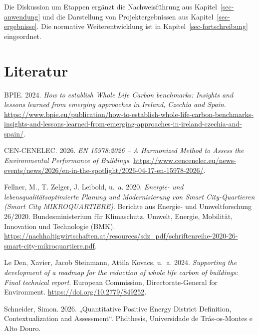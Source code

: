 \documentclass[
  ngerman,
  a4paper,
  DIV=11]{scrreprt}
\newlength{\cslhangindent}
\newenvironment{CSLReferences}[2] %
 {\begin{list}{}{%
  \setlength{\itemindent}{0pt}
  \setlength{\leftmargin}{0pt}
  \setlength{\parsep}{0pt}
  \ifodd #1
   \setlength{\leftmargin}{\cslhangindent}
   \setlength{\itemindent}{-1\cslhangindent}
  \fi
  \setlength{\itemsep}{#2\baselineskip}}}
 {\end{list}}
\begin{document}
Die Diskussion um Etappen ergänzt die Nachweisführung aus
Kapitel~\ref{sec-anwendung} und die Darstellung von Projektergebnissen
aus Kapitel~\ref{sec-ergebnisse}. Die normative Weiterentwicklung ist in
Kapitel~\ref{sec-fortschreibung} eingeordnet.


\chapter*{Literatur}\label{literatur}


\protect{}\label{refs}
\begin{CSLReferences}{1}{1}
BPIE. 2024. \emph{How to establish Whole Life Carbon benchmarks:
Insights and lessons learned from emerging approaches in Ireland,
Czechia and Spain}.
\url{https://www.bpie.eu/publication/how-to-establish-whole-life-carbon-benchmarks-insights-and-lessons-learned-from-emerging-approaches-in-ireland-czechia-and-spain/}.

CEN-CENELEC. 2026. \emph{{EN 15978:2026} -- A Harmonized Method to
Assess the Environmental Performance of Buildings}.
\url{https://www.cencenelec.eu/news-events/news/2026/en-in-the-spotlight/2026-04-17-en-15978-2026/}.

Fellner, M., T. Zelger, J. Leibold, u.~a. 2020. \emph{Energie- und
lebensqualitätsoptimierte Planung und Modernisierung von Smart
City-Quartieren (Smart City MIKROQUARTIERE)}. Berichte aus Energie- und
Umweltforschung 26/2020. Bundesministerium für Klimaschutz, Umwelt,
Energie, Mobilität, Innovation und Technologie (BMK).
\url{https://nachhaltigwirtschaften.at/resources/sdz_pdf/schriftenreihe-2020-26-smart-city-mikroquartiere.pdf}.

Le Den, Xavier, Jacob Steinmann, Attila Kovacs, u.~a. 2024.
\emph{Supporting the development of a roadmap for the reduction of whole
life carbon of buildings: Final technical report}. European Commission,
Directorate-General for Environment.
\url{https://doi.org/10.2779/849252}.

Schneider, Simon. 2026. {„Quantitative Positive Energy District
Definition, Contextualization and Assessment``}. Phdthesis, Universidade
de Trás-os-Montes e Alto Douro.


\end{CSLReferences}
\end{document}
